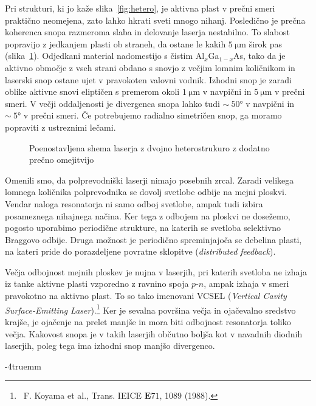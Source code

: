 Pri strukturi, ki jo kaže slika~\ref{fig:hetero}, je aktivna plast v prečni smeri praktično neomejena, 
zato lahko hkrati sveti mnogo nihanj. Posledično je prečna koherenca snopa razmeroma slaba in 
delovanje laserja nestabilno. To slabost popravijo z jedkanjem plasti ob straneh, da ostane le
kakih $5~\si{\micro\meter}$ širok pas (slika~\ref{fig:heshema}). 
Odjedkani material nadomestijo s čistim Al$_x$Ga$_{1-x}$As, 
tako da je aktivno območje z vseh strani obdano s snovjo z večjim lomnim količnikom in laserski
snop ostane ujet v pravokoten valovni vodnik. Izhodni snop je zaradi oblike aktivne snovi eliptičen s 
premerom okoli $1~\si{\micro\meter}$ v navpični in $5~\si{\micro\meter}$ v prečni smeri. 
V večji oddaljenosti je divergenca snopa lahko tudi $\sim~50\si{\degree}$ v navpični in $\sim~5\si{\degree}$ 
v prečni smeri. Če potrebujemo radialno simetričen snop, ga moramo popraviti z ustreznimi 
lečami.
\begin{figure}[ht]
\centering
\def\svgwidth{95truemm} 

\caption{Poenostavljena shema laserja z dvojno heterostrukuro z dodatno prečno omejitvijo
}
\label{fig:heshema}
\end{figure}
\begin{remark}
Omenili smo, da polprevodniški laserji nimajo posebnih zrcal. Zaradi velikega lomnega
količnika polprevodnika se dovolj svetlobe odbije na mejni ploskvi. Vendar naloga resonatorja ni 
samo odboj svetlobe, ampak tudi izbira posameznega nihajnega načina. Ker tega z odbojem 
na ploskvi ne dosežemo, pogosto uporabimo periodične strukture, na katerih se svetloba selektivno
Braggovo odbije. Druga možnost je periodično spreminjajoča se debelina plasti, na kateri pride
do porazdeljene povratne sklopitve ({\it distributed feedback}). 
 
Večja odbojnost mejnih ploskev je nujna v laserjih, pri katerih svetloba ne izhaja iz
tanke aktivne plasti vzporedno z ravnino spoja $p$-$n$, ampak izhaja v smeri pravokotno na aktivno plast.
To so tako imenovani VCSEL ({\it Vertical Cavity Surface-Emitting 
Laser}).\footnote{~F. Koyama et al., Trans. IEICE ${\mathbf E71}$, 1089 (1988).} Ker je sevalna površina večja in 
ojačevalno sredstvo krajše, je ojačenje na prelet manjše in mora biti odbojnost resonatorja toliko večja. 
Kakovost snopa je v takih laserjih občutno boljša kot v navadnih diodnih laserjih, poleg tega ima izhodni 
snop manjšo divergenco.
\end{remark}
\vglue-4truemm

